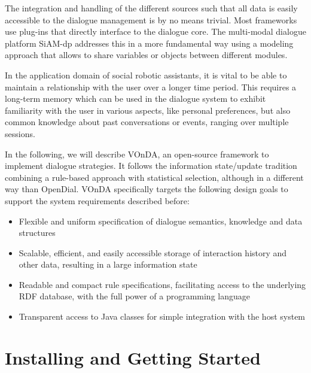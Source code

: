 \documentclass[a4paper]{report}
\newcommand{\vonda}{VOnDA\xspace}
\begin{document}
The integration and handling of the different sources such that all data is
easily accessible to the dialogue management is by no means trivial. Most
frameworks use plug-ins that directly interface to the dialogue core. The
multi-modal dialogue platform SiAM-dp \citep{nesselrath2014siam}
addresses this in a more fundamental way using a modeling approach that allows
to share variables or objects between different modules.

In the application domain of social robotic assistants, it is vital to be able
to maintain a relationship with the user over a longer time period. This requires a long-term
memory which can be used in the dialogue system to exhibit familiarity with the
user in various aspects, like personal preferences, but also common knowledge
about past conversations or events, ranging over multiple sessions.

In the following, we will describe \vonda, an open-source framework to
implement dialogue strategies. It follows the information state/update
tradition \citep{traum2003information}
combining a rule-based approach with statistical selection, although in a
different way than OpenDial. \vonda specifically targets the following design
goals to support the system requirements described before:

\begin{itemize}
  \addtolength{\itemsep}{-.6\itemsep}
\item Flexible and uniform specification of dialogue semantics, knowledge and
  data structures
\item Scalable, efficient, and easily accessible storage of interaction history
  and other data, resulting in a large information state
\item Readable and compact rule specifications, facilitating access to the
  underlying RDF database, with the full power of a programming language
\item Transparent access to Java classes for simple integration with the host
  system
\end{itemize}
\fi



%

\chapter{Installing and Getting Started}


\newpage

\newpage




\end{document}
